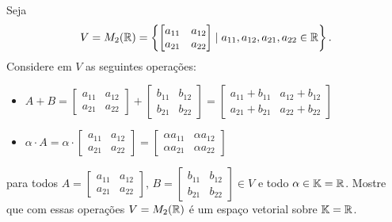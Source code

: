 \documentclass[12pt]{exam}
\begin{document}
    \questao{} Seja
    \[
        V = M_2(\mathbb{R}) = \left\{\begin{bmatrix}a_{11} & a_{12}\\a_{21} & a_{22} \end{bmatrix} \mid a_{11}, a_{12}, a_{21}, a_{22} \in \mathbb{R}\right\}.
    \]
    Considere em $V$ as seguintes operações:
    \begin{itemize}
        \item $A + B = \begin{bmatrix}a_{11} & a_{12}\\a_{21} & a_{22} \end{bmatrix} + \begin{bmatrix}b_{11} & b_{12}\\b_{21} & b_{22} \end{bmatrix} = \begin{bmatrix}a_{11} + b_{11 }& a_{12} + b_{12}\\a_{21} + b_{21} & a_{22} + b_{22}\end{bmatrix}$
        \item $\alpha \cdot A = \alpha \cdot \begin{bmatrix}a_{11} & a_{12}\\a_{21} & a_{22} \end{bmatrix} = \begin{bmatrix}\alpha a_{11} & \alpha a_{12}\\\alpha a_{21} & \alpha a_{22} \end{bmatrix}$
    \end{itemize}
    para todos $A = \begin{bmatrix}a_{11} & a_{12}\\a_{21} & a_{22} \end{bmatrix}$, $B = \begin{bmatrix}b_{11} & b_{12}\\b_{21} & b_{22} \end{bmatrix} \in V$ e todo $\alpha \in \mathbb{K} = \mathbb{R}$.
    Mostre que com essas operações $V = M_2(\mathbb{R})$ é um espaço vetorial sobre $\mathbb{K} = \mathbb{R}$.

    \solucao
\end{document}
